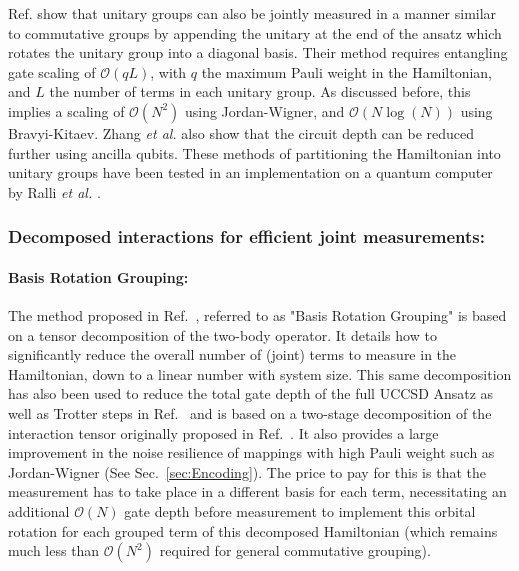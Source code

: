 Ref. \cite{Zhao2020} show that unitary groups can also be jointly measured in a manner similar to commutative groups by appending the unitary at the end of the ansatz which rotates the unitary group into a diagonal basis. Their method requires entangling gate scaling of $\mathcal{O}(qL)$, with $q$ the maximum Pauli weight in the Hamiltonian, and $L$ the number of terms in each unitary group. As discussed before, this implies a scaling of $\mathcal{O}(N^2)$ using Jordan-Wigner, and $\mathcal{O}(N \log(N))$ using Bravyi-Kitaev. Zhang \textit{et al.} \cite{Zhao2020} also show that the circuit depth can be reduced further using ancilla qubits. These methods of partitioning the Hamiltonian into unitary groups have been tested in an implementation on a quantum computer by Ralli \textit{et al.} \cite{Ralli2021}.

\subsubsection{Decomposed interactions for efficient joint measurements:} \label{sec:DecomposedInteractions}


\paragraph{Basis Rotation Grouping:}
The method proposed in Ref.~\cite{Huggins2021}, referred to as "Basis Rotation Grouping" is based on a tensor decomposition of the two-body operator. It details how to significantly reduce the overall number of (joint) terms to measure in the Hamiltonian, down to a linear number with system size. This same decomposition has also been used to reduce the total gate depth of the full UCCSD Ansatz as well as Trotter steps in Ref.~\cite{Motta2021} and is based on a two-stage decomposition of the interaction tensor originally proposed in Ref.~\cite{Peng2017}. It also provides a large improvement in the noise resilience of mappings with high Pauli weight such as Jordan-Wigner (See Sec.~\ref{sec:Encoding}). The price to pay for this is that the measurement has to take place in a different basis for each term, necessitating an additional $\mathcal{O}(N)$ gate depth before measurement to implement this orbital rotation for each grouped term of this decomposed Hamiltonian (which remains much less than $\mathcal{O}(N^2)$ required for general commutative grouping).

